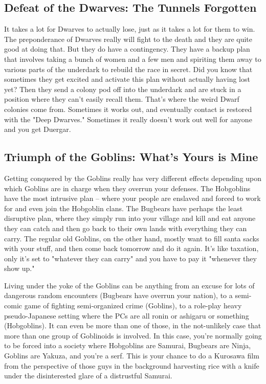 \subsection{Defeat of the Dwarves: The Tunnels Forgotten}

It takes a lot for Dwarves to actually lose, just as it takes a lot for them to win. The preponderance of Dwarves really will fight to the death and they are quite good at doing that. But they do have a contingency. They have a backup plan that involves taking a bunch of women and a few men and spiriting them away to various parts of the underdark to rebuild the race in secret. Did you know that sometimes they get excited and activate this plan without actually having lost yet? Then they send a colony pod off into the underdark and are stuck in a position where they can't easily recall them. That's where the weird Dwarf colonies come from. Sometimes it works out, and eventually contact is restored with the "Deep Dwarves." Sometimes it really doesn't work out well for anyone and you get Duergar.

\subsection{Triumph of the Goblins: What's Yours is Mine}

Getting conquered by the Goblins really has very different effects depending upon which Goblins are in charge when they overrun your defenses. The Hobgoblins have the most intrusive plan -- where your people are enslaved and forced to work for and even join the Hobgoblin clans. The Bugbears have perhaps the least disruptive plan, where they simply run into your village and kill and eat anyone they can catch and then go back to their own lands with everything they can carry. The regular old Goblins, on the other hand, mostly want to fill santa sacks with your stuff, and then come back tomorrow and do it again. It's like taxation, only it's set to "whatever they can carry" and you have to pay it "whenever they show up."

Living under the yoke of the Goblins can be anything from an excuse for lots of dangerous random encounters (Bugbears have overrun your nation), to a semi-comic game of fighting semi-organized crime (Goblins), to a role-play heavy pseudo-Japanese setting where the PCs are all ronin or ashigaru or something (Hobgoblins). It can even be more than one of those, in the not-unlikely case that more than one group of Goblinoids is involved. In this case, you're normally going to be forced into a society where Hobgoblins are Samurai, Bugbears are Ninja, Goblins are Yakuza, and you're a serf. This is your chance to do a Kurosawa film from the perspective of those guys in the background harvesting rice with a knife under the disinterested glare of a distrustful Samurai.

